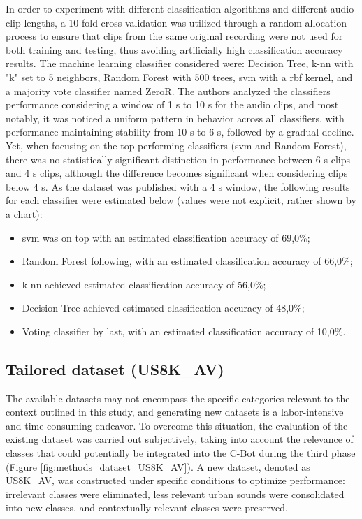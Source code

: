 In order to experiment with different classification algorithms and different audio clip lengths, a 10-fold cross-validation was utilized through a random allocation process to ensure that clips from the same original recording were not used for both training and testing, thus avoiding artificially high classification accuracy results. The machine learning classifier considered were: Decision Tree, \gls{k-nn} with "k" set to 5 neighbors, Random Forest with 500 trees, \gls{svm} with a \gls{rbf} kernel, and a majority vote classifier named ZeroR. The authors analyzed the classifiers performance considering a window of 1 \gls{s} to 10 \gls{s} for the audio clips, and most notably, it was noticed a uniform pattern in behavior across all classifiers, with performance maintaining stability from 10 \gls{s} to 6 \gls{s}, followed by a gradual decline. Yet, when focusing on the top-performing classifiers (\gls{svm} and Random Forest), there was no statistically significant distinction in performance between 6 \gls{s} clips and 4 \gls{s} clips, although the difference becomes significant when considering clips below 4 \gls{s}. As the dataset was published with a 4 \gls{s} window, the following results for each classifier were estimated below (values were not explicit, rather shown by a chart):

\begin{itemize}
    \item \gls{svm} was on top with an estimated classification accuracy of 69,0\%;
    \item Random Forest following, with an estimated classification accuracy of 66,0\%;
    \item \gls{k-nn} achieved estimated classification accuracy of 56,0\%;
    \item Decision Tree achieved estimated classification accuracy of 48,0\%;
    \item Voting classifier by last, with an estimated classification accuracy of 10,0\%. 
\end{itemize}


\subsection{Tailored dataset (US8K\_AV)}
\label{subsec:dataset_US8K-AV}

The available datasets may not encompass the specific categories relevant to the context outlined in this study, and generating new datasets is a labor-intensive and time-consuming endeavor. To overcome this situation,  the evaluation of the existing dataset was carried out subjectively, taking into account the relevance of classes that could potentially be integrated into the C-Bot during the third phase (Figure \ref{fig:methods_dataset_US8K_AV}). A new dataset, denoted as US8K\_AV, was constructed under specific conditions to optimize performance: irrelevant classes were eliminated, less relevant urban sounds were consolidated into new classes, and contextually relevant classes were preserved.

